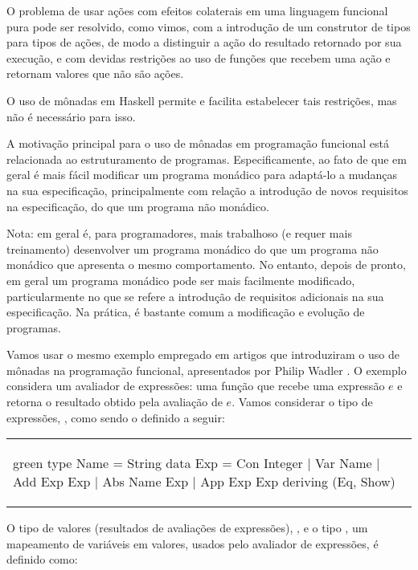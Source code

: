 O problema de usar ações com efeitos colaterais em uma linguagem
funcional pura pode ser resolvido, como vimos, com a introdução de um
construtor de tipos para tipos de ações, de modo a distinguir a ação
do resultado retornado por sua execução, e com devidas restrições ao
uso de funções que recebem uma ação e retornam valores que não são
ações.

O uso de mônadas em Haskell permite e facilita estabelecer tais
restrições, mas não é necessário para isso. 

A motivação principal para o uso de mônadas em programação funcional
está relacionada ao estruturamento de programas. Especificamente, ao
fato de que em geral é mais fácil modificar um programa monádico para
adaptá-lo a mudanças na sua especificação, principalmente com relação
a introdução de novos requisitos na especificação, do que um programa
não monádico.

Nota: em geral é, para programadores, mais trabalhoso (e requer mais
treinamento) desenvolver um programa monádico do que um programa não
monádico que apresenta o mesmo comportamento. No entanto, depois de
pronto, em geral um programa monádico pode ser mais facilmente
modificado, particularmente no que se refere a introdução de
requisitos adicionais na sua especificação. Na prática, é bastante
comum a modificação e evolução de programas.

Vamos usar o mesmo exemplo empregado em artigos que introduziram o uso
de mônadas na programação funcional, apresentados por Philip
Wadler \cite{Monads-for-fp-Wadler-95,Wadler:1992:Essence-of-FP}. O
exemplo considera um avaliador de expressões: uma função 
que recebe uma expressão $e$ e retorna o resultado obtido pela
avaliação de $e$. Vamos considerar o tipo de expressões, ,
como sendo o definido a seguir:

\begin{center}
\begin{tabular}{l}
\begin{hask}{}{green}
type Name   =  String 
data Exp    =  Con Integer
            |  Var  Name
            |  Add  Exp  Exp
            |  Abs  Name Exp
            |  App  Exp  Exp
            deriving (Eq, Show)
\end{hask}
\end{tabular}
\end{center}

O tipo de valores (resultados de avaliações de expressões),
, e o tipo , um mapeamento de variáveis em
valores, usados pelo avaliador de expressões, é definido como:

